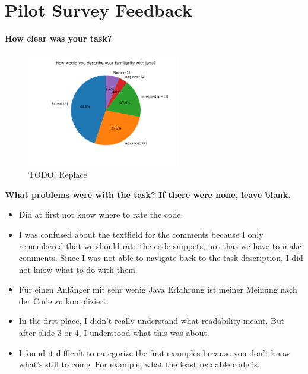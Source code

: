 \documentclass[%
class=scrreprt,
chapterprefix=false,%
open=right,%
twoside=false,%
paper=a4,%
logofile={Logo\_zentral\_farbig\_EN.png},%
thesistype=master,%
UKenglish,%
]{se2thesis}
\renewcommand{\thesection}{\arabic{section}}
\renewcommand{\thechapter}{\arabic{chapter}.0}
\theoremstyle{definition}
\begin{document}
\printbibliography
	
	\appendix
	\renewcommand{\thechapter}{\alph{chapter}}
	\renewcommand{\thesection}{\Roman{section}}
	\renewcommand{\thesubsection}{\fnsymbol{subsection}}
	
\pagebreak
\section{Pilot Survey Feedback}\label{appendix:pilot-survey-feedback}

	\textbf{How clear was your task?}
	\begin{figure}[h!]
		\centering
		\includegraphics[width=0.6\textwidth]{img/survey_Java_familiarity_pie.png} %
		\caption{TODO: Replace}
		\label{fig:pilot-task-clear}
	\end{figure}
	
	\textbf{What problems were with the task? If there were none, leave blank.}
	\begin{itemize}
		\item Did at first not know where to rate the code.
		\item I was confused about the textfield for the comments because I only remembered that we should rate the code snippets, not that we have to make comments. Since I was not able to navigate back to the task description, I did not know what to do with them.
		\item Für einen Anfänger mit sehr wenig Java Erfahrung ist meiner Meinung nach der Code zu kompliziert.
		\item In the first place, I didn't really understand what readability meant. But after slide 3 or 4, I understood what this was about.
		\item I found it difficult to categorize the first examples because you don't know what's still to come. For example, what the least readable code is.
	\end{itemize}
\end{document}
